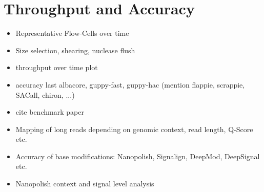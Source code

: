 \section{Throughput and Accuracy}

\begin{itemize}
    \item Representative Flow-Cells over time
    \item Size selection, shearing, nuclease flush
    \item throughput over time plot
    \item accuracy last albacore, guppy-fast, guppy-hac (mention flappie, scrappie, SACall, chiron, ...)
    \item cite benchmark paper
    \item Mapping of long reads depending on genomic context, read length, Q-Score etc.
    \item Accuracy of base modifications: Nanopolish, Signalign, DeepMod, DeepSignal etc.
    \item Nanopolish context and signal level analysis
\end{itemize}
